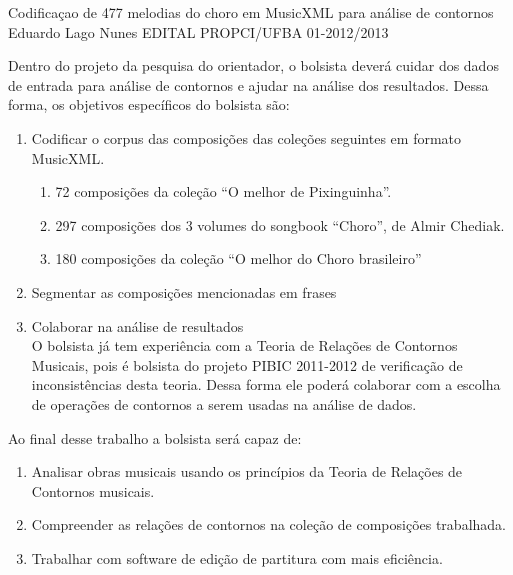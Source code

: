 \documentclass[11pt]{article}
\begin{document}

\dadosBolsista
{Codificaçao de 477 melodias do choro em MusicXML para análise de
  contornos}
{Eduardo Lago Nunes}
{EDITAL PROPCI/UFBA 01-2012/2013}

\newpage


Dentro do projeto da pesquisa do orientador, o bolsista deverá cuidar
dos dados de entrada para análise de contornos e ajudar na análise dos
resultados. Dessa forma, os objetivos específicos do bolsista são:

\begin{enumerate}
\item Codificar o corpus das composições das coleções seguintes em
  formato MusicXML.
  \begin{enumerate}
  \item 72 composições da coleção ``O melhor de Pixinguinha''.
  \item 297 composições dos 3 volumes do songbook ``Choro'', de Almir
    Chediak.
  \item 180 composições da coleção ``O melhor do Choro brasileiro''
  \end{enumerate}
\item Segmentar as composições mencionadas em frases
\item Colaborar na análise de resultados\\ O bolsista já tem
  experiência com a Teoria de Relações de Contornos Musicais, pois é
  bolsista do projeto PIBIC 2011-2012 de verificação de
  inconsistências desta teoria. Dessa forma ele poderá colaborar com a
  escolha de operações de contornos a serem usadas na análise de
  dados.
\end{enumerate}


Ao final desse trabalho a bolsista será capaz de:
\begin{enumerate}
\item Analisar obras musicais usando os princípios da Teoria de
  Relações de Contornos musicais.
\item Compreender as relações de contornos na coleção de composições
  trabalhada.
\item Trabalhar com software de edição de partitura com mais
  eficiência.
\end{enumerate}

\end{document}
